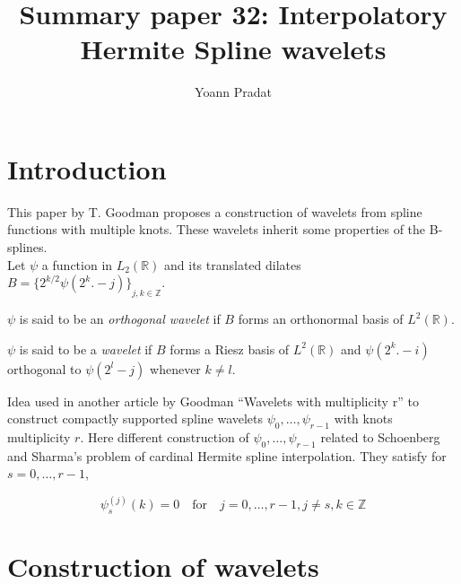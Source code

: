 \documentclass[a4paper, 11pt]{article}
\begin{document}
\title{Summary paper 32: Interpolatory Hermite Spline wavelets}
\author{Yoann Pradat}
\maketitle

\section{Introduction}

This paper by T. Goodman proposes a construction of wavelets from spline functions with multiple knots. These wavelets 
inherit some properties of the B-splines. \\

Let $\psi$ a function in $L_2(\mathbb{R})$ and its translated dilates $B = {\{ 2^{k/2} \psi(2^k. -j) \}}_{j,k \in 
\mathbb{Z}}$. 

\begin{deftn}{1}
  $\psi$ is said to be an \emph{orthogonal wavelet} if $B$ forms an orthonormal basis of $L^2(\mathbb{R})$.
\end{deftn}

\begin{deftn}{2}
  $\psi$ is said to be a \emph{wavelet} if $B$ forms a Riesz basis of $L^2(\mathbb{R})$ and $\psi(2^k.-i)$ orthogonal to 
  $\psi(2^l-j)$ whenever $k \neq l$.
\end{deftn}

Idea used in another article by Goodman “Wavelets with multiplicity r” to construct compactly supported spline wavelets 
$\psi_0, \ldots, \psi_{r-1}$ with knots multiplicity $r$. Here different construction of $\psi_0, \ldots, \psi_{r-1}$ 
related to Schoenberg and Sharma's problem of cardinal Hermite spline interpolation. They satisfy for $s=0, \ldots, 
r-1$,

\begin{equation}
  \psi_s^{(j)}(k) = 0 \quad \text{for} \quad j=0, \ldots, r-1, j\neq s, k\in \mathbb{Z}
\end{equation}

\section{Construction of wavelets}
\end{document}
